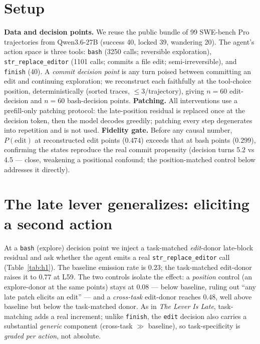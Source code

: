 \documentclass[11pt]{article}
\begin{document}
\section{Setup}\label{sec:setup}
\textbf{Data and decision points.} We reuse the public bundle of 99 SWE-bench Pro~\cite{swebench} trajectories from
Qwen3.6-27B (success 40, locked 39, wandering 20). The agent's action space is three tools: \texttt{bash}
(3250 calls; reversible exploration), \texttt{str\_replace\_editor} (1101 calls; commits a file edit;
semi-irreversible), and \texttt{finish} (40). A \emph{commit decision point} is any turn poised between
committing an edit and continuing exploration; we reconstruct each faithfully at the tool-choice position,
deterministically (sorted traces, $\le 3$/trajectory), giving $n{=}60$ edit-decision and $n{=}60$
bash-decision points. \textbf{Patching.} All interventions use a prefill-only patching protocol: the late-position residual is replaced once at the decision token, then the model decodes greedily;
patching every step degenerates into repetition and is not used. \textbf{Fidelity gate.} Before any causal
number, $P(\text{edit})$ at reconstructed edit points ($0.474$) exceeds that at bash points ($0.299$), confirming
the states reproduce the real commit propensity (decision turns 5.2 vs 4.5 --- close, weakening a positional
confound; the position-matched control below addresses it directly).

\section{The late lever generalizes: eliciting a second action}\label{sec:elicit}
At a \texttt{bash} (explore) decision point we inject a task-matched \emph{edit}-donor late-block residual and
ask whether the agent emits a real \texttt{str\_replace\_editor} call (Table~\ref{tab:h1}). The baseline
emission rate is $0.23$; the task-matched edit-donor raises it to $0.77$ at L59. The two controls isolate the
effect: a \emph{position} control (an explore-donor at the same points) stays at $0.08$ --- below baseline,
ruling out ``any late patch elicits an edit'' --- and a \emph{cross-task} edit-donor reaches $0.48$, well above
baseline but below the task-matched donor. As in \emph{The Lever Is Late}, task-matching adds a real increment;
unlike \texttt{finish}, the \texttt{edit} decision also carries a substantial \emph{generic} component
(cross-task $\gg$ baseline), so task-specificity is \emph{graded per action}, not absolute.
\end{document}
